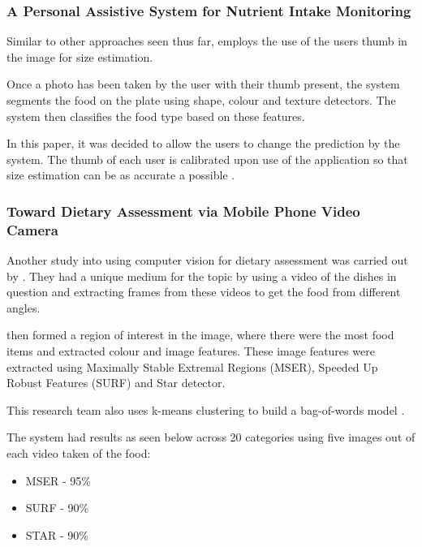 
\subsubsection*{A Personal Assistive System for Nutrient Intake Monitoring}
Similar to other approaches seen thus far, \textcite{personalAssistive} employs the use of the users thumb in the image for size estimation.

Once a photo has been taken by the user with their thumb present, the system segments the food on the plate using shape, colour and texture detectors.
The system then classifies the food type based on these features.

In this paper, it was decided to allow the users to change the prediction by the system.
The thumb of each user is calibrated upon use of the application so that size estimation can be as accurate a possible \textcite{personalAssistive}.

\subsubsection*{Toward Dietary Assessment via Mobile Phone Video Camera}
Another study into using computer vision for dietary assessment was carried out by \textcite{chen2010toward}. They had a unique medium for the topic by using a video of the dishes in question and extracting frames from these videos to get the food from different angles.

\textcite{chen2010toward} then formed a region of interest in the image, where there were the most food items and extracted colour and image features.
These image features were extracted using Maximally Stable Extremal Regions (MSER), Speeded Up Robust Features (SURF) and Star detector.

This research team also uses k-means clustering to build a bag-of-words model \textcite{chen2010toward}.

The system had results as seen below across 20 categories using five images out of each video taken of the food:
\begin{itemize}
	\item{MSER - 95\%}
	\item{SURF - 90\%}
	\item{STAR - 90\%}
\end{itemize}

